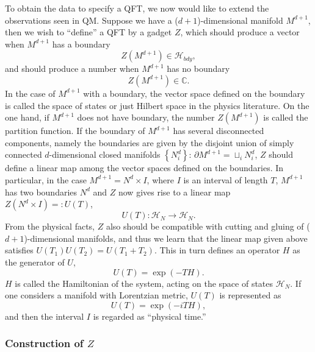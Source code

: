 To obtain the data to specify a QFT, we now would like to extend the
observations seen in QM. Suppose we have a ($d+1$)-dimensional manifold
$M^{d+1}$, then we wish to ``define'' a QFT by a gadget $Z$, which
should produce a vector when $M^{d+1}$ has a boundary
\begin{equation}
Z\left(M^{d+1}\right)  \in  \mathcal{H}_{bdy},
\end{equation}
 and should produce a number when $M^{d+1}$ has no boundary
\begin{equation}
Z\left(M^{d+1}\right)  \in  \mathbb{C}.
\end{equation}
In the case of $M^{d+1}$ with a boundary, the vector space defined
on the boundary is called the space of states or just Hilbert space
in the physics literature. On the one hand, if $M^{d+1}$ does not
have boundary, the number $Z\left(M^{d+1}\right)$ is called the partition
function. If the boundary of $M^{d+1}$ has several disconnected components,
namely the boundaries are given by the disjoint union of simply connected
$d$-dimensional closed manifolds $\left\{ N_{i}^{d}\right\} $: $\partial M^{d+1}=\sqcup_{i}N_{i}^{d}$,
$Z$ should define a linear map among the vector spaces defined on
the boundaries. In particular, in the case $M^{d+1}=N^{d}\times I$,
where $I$ is an interval of length $T$, $M^{d+1}$ has two boundaries
$N^{d}$ and $Z$ now gives rise to a linear map $Z\left(N^{d}\times I\right)=:U\left(T\right)$,
\begin{equation}
  U\left(T\right)  :  \mathcal{H}_{N}  \longrightarrow  \mathcal{H}_{N}.
\end{equation}
From the physical facts, $Z$ also should be compatible with cutting and
gluing of ($d+1$)-dimensional manifolds, and thus we learn that the
linear map given above satisfies $U\left(T_{1}\right)U\left(T_{2}\right) = U\left(T_{1}+T_{2}\right)$.
This in turn defines an operator $H$ as the generator of $U$,
\begin{equation}
  U\left(T\right)  =  \exp\left(-TH\right).
\end{equation}
 $H$ is called the Hamiltonian of the system, acting on the space
of states $\mathcal{H}_{N}$. If one considers a manifold
with Lorentzian metric, $U\left(T\right)$ is represented as
\begin{equation}
  U\left(T\right)  =  \exp\left(-iTH\right),
\end{equation}
and then the interval $I$ is regarded as ``physical time.''

\subsubsection{Construction of $Z$}

